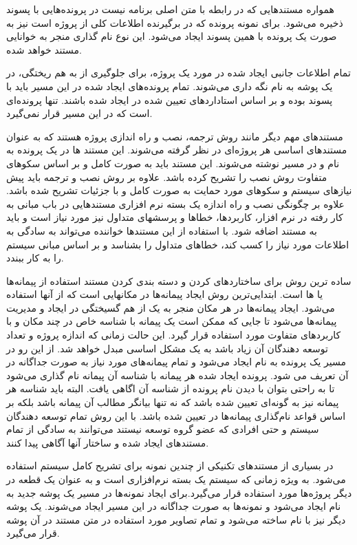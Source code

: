   همواره مستندهایی که در رابطه با متن اصلی برنامه نیست در پرونده‌هایی با پسوند
   ذخیره می‌شود. برای نمونه پرونده  که در برگیرنده
  اطلاعات کلی از پروژه است نیز به صورت یک پرونده با همین پسوند ایجاد
  می‌شود. این نوع نام گذاری منجر به خوانایی مستند خواهد شده.

  تمام اطلاعات جانبی ایجاد شده در مورد یک پروژه، برای جلوگیری از به هم ریختگی،
  در یک پوشه به نام  نگه داری می‌شوند. تمام پرونده‌های ایجاد شده در این
  مسیر باید با پسوند  بوده و بر اساس استاداردهای تعیین شده در
   ایجاد شده باشند.  تنها پرونده‌ای است که در این مسیر
  قرار نمی‌گیرد.
  
  مستندهای مهم دیگر مانند روش ترجمه، نصب و راه اندازی پروژه هستند که به عنوان 
مستندهای اساسی هر پروژه‌ای در نظر گرفته می‌شوند. این مستند ها در
  یک پرونده به نام  و در مسیر  نوشته می‌شوند.
 این مستند باید به صورت کامل و بر
  اساس سکوهای متفاوت روش نصب را تشریح کرده باشد. علاوه بر روش نصب و ترجمه باید
  پیش نیازهای سیستم و سکوهای مورد حمایت به صورت کامل و با
  جزئیات تشریح شده باشد. علاوه بر چگونگی نصب و راه اندازه یک بسته نرم افزاری
  مستندهایی در باب مبانی به کار رفته در نرم افزار، کاربردها، خطاها و پرسشهای
  متداول نیز مورد نیاز است و باید به مستند اضافه شود. با استفاده از این مستندها
  خواننده می‌تواند به سادگی به اطلاعات مورد نیاز را کسب کند، خطاهای متداول را بشناسد
  و بر اساس مبانی  سیستم را به کار ببندد.
  
  ساده ترین روش برای ساختاردهای کردن و دسته بندی کردن مستند استفاده از
  پیمانه‌ها یا ها است. ابتدایی‌ترین روش ایجاد پیمانه‌ها در مکانهایی است
  که از آنها استفاده می‌شود. ایجاد پیمانه‌ها در هر مکان منجر به یک از هم
  گسیختگی در ایجاد و مدیریت پیمانه‌ها می‌شود تا جایی که ممکن است یک پیمانه با
  شناسه خاص در چند مکان و با کاربردهای متفاوت مورد استفاده قرار گیرد. این حالت
  زمانی که اندازه پروژه و تعداد توسعه دهندگان آن زیاد باشد به یک مشکل اساسی
  مبدل خواهد شد. از این رو در مسیر  یک پرونده به نام  ایجاد
  می‌شود و تمام پیمانه‌های مورد نیاز به صورت جداگانه در آن تعریف می شود. پرونده
  ایجاد شده هر پیمانه با شناسه آن پیمانه نام گذاری می‌شود تا به راحتی بتوان با دیدن نام پرونده از
  شناسه آن اگاهی یافت. البته باید شناسه هر پیمانه نیز به گونه‌ای تعیین
  شده باشد که نه تنها بیانگر مطالب آن پیمانه باشد بلکه بر اساس قواعد نام‌گذاری 
پیمانه‌ها در  تعیین شده باشد. با این
  روش تمام توسعه دهندگان سیستم و حتی افرادی که عضو گروه توسعه نیستند
  می‌توانند به سادگی از تمام مستندهای ایجاد شده و ساختار آنها آگاهی پیدا کنند.
  
  در بسیاری از مستندهای تکنیکی از چندین نمونه برای تشریح کامل سیستم استفاده
  می‌شود. به ویژه زمانی که سیستم یک بسته نرم‌افزاری است و به عنوان یک قطعه در
  دیگر پروژه‌ها مورد استفاده قرار می‌گیرد.برای ایجاد نمونه‌ها در مسیر 
  یک پوشه جدید به نام  ایجاد می‌شود و نمونه‌ها به صورت جداگانه در
  این مسیر ایجاد می‌شوند. یک پوشه دیگر نیز با نام  ساخته می‌شود و تمام 
  تصاویر مورد استفاده در متن مستند در آن پوشه قرار می‌گیرد.
  
